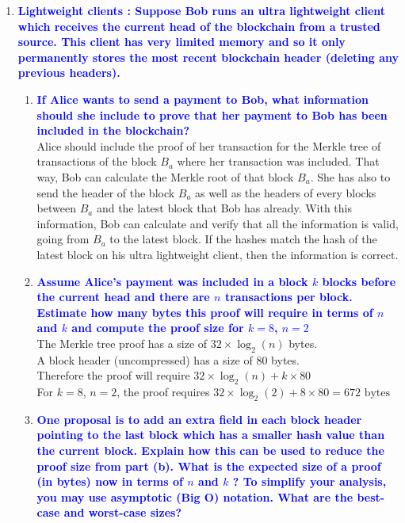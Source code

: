 \documentclass[11pt]{article}
\begin{document}
\begin{enumerate}
\item \textbf{\textcolor{blue}{Lightweight clients : Suppose Bob runs an ultra lightweight client which receives the current head of the blockchain from a trusted source. This client has very limited memory and so it only permanently stores the most recent blockchain header (deleting any previous headers).}}
    \begin{enumerate}
    \item \textbf{\textcolor{blue}{If Alice wants to send a payment to Bob, what information should she include to prove that her payment to Bob has been included in the blockchain?}}
        \\ Alice should include the proof of her transaction for the Merkle tree of transactions of the block $B_a$  where her transaction was included. That way, Bob can calculate the Merkle root of that block $B_a$. She has also to send the header of the block $B_a$ as well as the headers of every blocks between $B_a$ and the latest block that Bob has already. With this information, Bob can calculate and verify that all the information is valid, going from $B_a$ to the latest block. If the hashes match the hash of the latest block on his ultra lightweight client, then the information is correct.
    \item \textbf{\textcolor{blue}{Assume Alice's payment was included in a block $k$ blocks before the current head and there are $n$ transactions per block. Estimate how many bytes this proof will require in terms of $n$ and $k$ and compute the proof size for $k=8$, $n=2$}}
        \\ The Merkle tree proof has a size of $32 \times \log_2(n)$ bytes.
        \\ A block header (uncompressed) has a size of $80$ bytes.
        \\ Therefore the proof will require $32 \times \log_2(n) + k \times 80$
        \\ For $k=8$, $n=2$, the proof requires $32 \times \log_2(2) + 8 \times 80 = 672 \text{ bytes}$
    \item \textbf{\textcolor{blue}{One proposal is to add an extra field in each block header pointing to the last block which has a 
    smaller hash value than the current block. Explain how this can be used to reduce the proof size from part (b). What is the expected
    size of a proof (in bytes) now in terms of $n$ and $k$ ? To simplify your analysis, you may use asymptotic (Big O) notation. What are 
    the best-case and worst-case sizes?}}
        \\ 
    \end{enumerate}
    

\end{enumerate}
\end{document}
